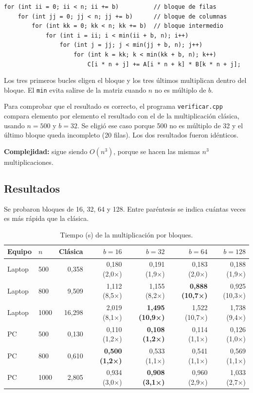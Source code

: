 \documentclass[11pt]{article}
\begin{document}
\begin{lstlisting}[caption={Multiplicación por bloques con seis bucles.}]
for (int ii = 0; ii < n; ii += b)          // bloque de filas
    for (int jj = 0; jj < n; jj += b)      // bloque de columnas
        for (int kk = 0; kk < n; kk += b)  // bloque intermedio
            for (int i = ii; i < min(ii + b, n); i++)
                for (int j = jj; j < min(jj + b, n); j++)
                    for (int k = kk; k < min(kk + b, n); k++)
                        C[i * n + j] += A[i * n + k] * B[k * n + j];
\end{lstlisting}

Los tres primeros bucles eligen el bloque y los tres últimos multiplican
dentro del bloque. El \texttt{min} evita salirse de la matriz cuando $n$ no es
múltiplo de $b$.

Para comprobar que el resultado es correcto, el programa
\texttt{verificar.cpp} compara elemento por elemento el resultado con el de la
multiplicación clásica, usando $n=500$ y $b=32$. Se eligió ese caso porque
500 no es múltiplo de 32 y el último bloque queda incompleto (20 filas). Los
dos resultados fueron idénticos.

\textbf{Complejidad:} sigue siendo $O(n^3)$, porque se hacen las mismas $n^3$
multiplicaciones.

\subsection{Resultados}

Se probaron bloques de 16, 32, 64 y 128. Entre paréntesis se indica cuántas
veces es más rápida que la clásica.

\begin{table}[H]
\centering
\caption{Tiempo (s) de la multiplicación por bloques.}
\small
\begin{tabular}{llrrrrr}
\toprule
Equipo & $n$ & Clásica & $b=16$ & $b=32$ & $b=64$ & $b=128$ \\
\midrule
Laptop & 500  & 0,358  & 0,180 (2,0×) & 0,191 (1,9×) & 0,183 (2,0×) & 0,188 (1,9×) \\
Laptop & 800  & 9,509  & 1,112 (8,5×) & 1,155 (8,2×) & \textbf{0,888 (10,7×)} & 0,925 (10,3×) \\
Laptop & 1000 & 16,298 & 2,019 (8,1×) & \textbf{1,495 (10,9×)} & 1,522 (10,7×) & 1,738 (9,4×) \\
\midrule
PC & 500  & 0,130 & 0,110 (1,2×) & \textbf{0,108 (1,2×)} & 0,114 (1,1×) & 0,126 (1,0×) \\
PC & 800  & 0,610 & \textbf{0,500 (1,2×)} & 0,533 (1,1×) & 0,541 (1,1×) & 0,569 (1,1×) \\
PC & 1000 & 2,805 & 0,934 (3,0×) & \textbf{0,908 (3,1×)} & 0,960 (2,9×) & 1,033 (2,7×) \\
\bottomrule
\end{tabular}
\end{table}
\end{document}

